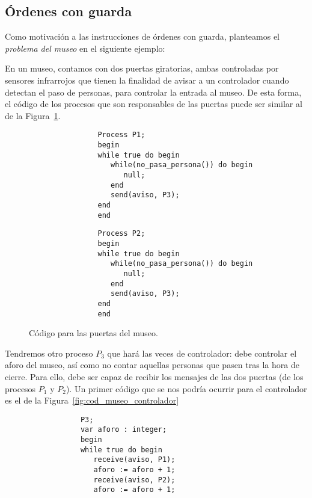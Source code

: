 \subsection{Órdenes con guarda}\label{sec:ordenes_guarda}
Como motivación a las instrucciones de órdenes con guarda, planteamos el \textit{problema del museo} en el siguiente ejemplo:
\begin{ejemplo}
    En un museo, contamos con dos puertas giratorias, ambas controladas por sensores infrarrojos que tienen la finalidad de avisar a un controlador cuando detectan el paso de personas, para controlar la entrada al museo. De esta forma, el código de los procesos que son responsables de las puertas puede ser similar al de la Figura~\ref{fig:cod_museo}.\\
    \begin{figure}
        \centering
        \setlength{\columnsep}{1cm}
        \begin{multicols}{2}
            \begin{verbatim}
                Process P1;
                begin
                while true do begin
                   while(no_pasa_persona()) do begin
                      null;
                   end
                   send(aviso, P3);
                end
                end
            \end{verbatim}
            \begin{verbatim}
                Process P2;
                begin
                while true do begin
                   while(no_pasa_persona()) do begin
                      null;
                   end
                   send(aviso, P3);
                end
                end
            \end{verbatim}
        \end{multicols}
        \caption{Código para las puertas del museo.}
        \label{fig:cod_museo}
    \end{figure}

    Tendremos otro proceso $P_3$ que hará las veces de controlador: debe controlar el aforo del museo, así como no contar aquellas personas que pasen tras la hora de cierre. Para ello, debe ser capaz de recibir los mensajes de las dos puertas (de los procesos $P_1$ y $P_2$). Un primer código que se nos podría ocurrir para el controlador es el de la Figura~\ref{fig:cod_museo_controlador}
    \begin{figure}
        \centering
        \begin{verbatim}
            P3;
            var aforo : integer;
            begin
            while true do begin
               receive(aviso, P1);
               aforo := aforo + 1;
               receive(aviso, P2);
               aforo := aforo + 1;


\end{verbatim}
\end{figure}
\end{ejemplo}

